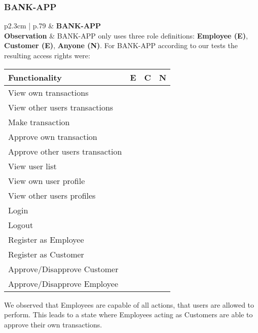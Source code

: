 \subsubsection{BANK-APP}
\begin{longtable}[l]{ p{2.3cm} | p{.79\linewidth} }\hline
    & \textbf{BANK-APP} \\ \hline
    \textbf{Observation} &
    	BANK-APP only uses three role definitions: \textbf{Employee (E)}, \textbf{Customer (E)}, \textbf{Anyone (N)}.
		For BANK-APP according to our tests the resulting access rights were:
		\begin{center}
		    \begin{tabular}{ | l | l | l | l |}
		    \hline
		    \textbf{Functionality} 			& \textbf{E} & \textbf{C} & \textbf{N} \\ \hline
		    View own transactions 			& \cmark  	& \cmark 	& \xmark \\ \hline
		    View other users transactions 	& \cmark 	& \xmark	& \xmark \\ \hline
		    Make transaction 				& \cmark 	& \cmark 	& \xmark \\ \hline
		    Approve own transaction 		& \cmark 	& \xmark 	& \xmark \\ \hline
		    Approve other users transaction & \cmark 	& \xmark 	& \xmark \\ \hline
		    View user list 					& \cmark 	& \xmark 	& \xmark \\ \hline
		    View own user profile 			& \cmark 	& \cmark 	& \xmark \\ \hline
		    View other users profiles 		& \cmark 	& \xmark 	& \xmark \\ \hline
		    Login 							& \cmark 	& \cmark 	& \xmark \\ \hline
		    Logout 							& \cmark 	& \cmark 	& \xmark \\ \hline
		    Register as Employee 			& \cmark 	& \cmark 	& \cmark \\ \hline
		    Register as Customer 			& \cmark 	& \cmark 	& \cmark \\ \hline
		    Approve/Disapprove Customer 	& \cmark 	& \xmark 	& \xmark \\ \hline
		    Approve/Disapprove Employee 	& \cmark 	& \xmark 	& \xmark \\ \hline
		    \end{tabular}
		\end{center}
		We observed that Employees are capable of all actions, that users are allowed to perform.
		This leads to a state where Employees acting as Customers are able to approve their own transactions.

\end{longtable}
